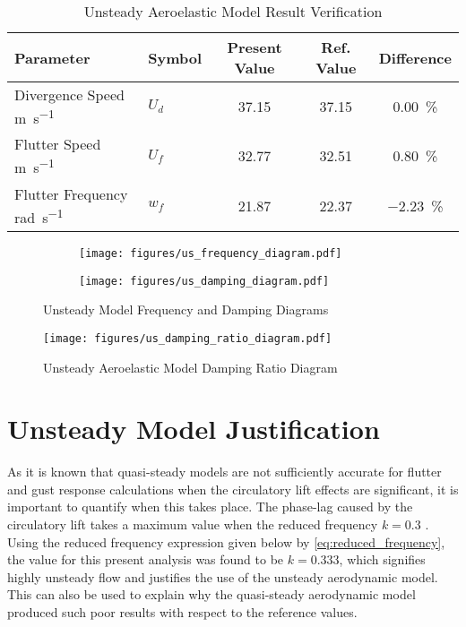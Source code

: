 \begin{table}[H]
    \centering
    \caption{Unsteady Aeroelastic Model Result Verification}
    \label{tab:us_verification}
    \begin{tabularx}{\textwidth}{p{}P{0.1\textwidth}CCC}
    \toprule
    \textbf{Parameter} & \textbf{Symbol} &\textbf{Present Value}
    &\textbf{Ref. Value \autocite{howcroftEfficientAeroelasticBeam2019}}
    & \textbf{Difference} \\
    \midrule
    Divergence Speed \si{\meter\per\second}
    & $U_d$ & 37.15 & 37.15 & \SI{0.00}{\percent}\\
    Flutter Speed \si{\meter\per\second}
    & $U_f$ & 32.77 & 32.51 & \SI{0.80}{\percent}\\
    Flutter Frequency \si{\radian\per\second}
    & $w_f$ & 21.87 & 22.37 & \SI{-2.23}{\percent} \\ \bottomrule
    \end{tabularx}
\end{table}

\begin{figure}[H]
    \centering
    \begin{subfigure}[b]{0.5\textwidth}
      \centering
      \texttt{[image: figures/us\_frequency\_diagram.pdf]}
      \label{fig:us_frequency}
    \end{subfigure}%
    \begin{subfigure}[b]{0.5\textwidth}
      \centering
      \texttt{[image: figures/us\_damping\_diagram.pdf]}
      \label{fig:us_damping}
    \end{subfigure}
    \caption{Unsteady Model Frequency and Damping Diagrams} %
    \label{fig:us_flutter_diagram}
\end{figure}

\begin{figure}[H]
    \centering
    \texttt{[image: figures/us\_damping\_ratio\_diagram.pdf]}
    \caption{Unsteady Aeroelastic Model Damping Ratio Diagram}
    \label{fig:us_damping_ratio}
\end{figure}

\section{Unsteady Model Justification}
As it is known that quasi-steady models are not sufficiently accurate for
flutter and gust response calculations when the circulatory lift effects are
significant, it is important to quantify when this takes place. The phase-lag
caused by the circulatory lift takes a maximum value when the reduced frequency
$k=0.3$ \autocite[p.157]{wrightIntroductionAircraftAeroelasticity}. Using the
reduced frequency expression given below by \cref{eq:reduced_frequency}, the
value for this present analysis was found to be $k=0.333$, which signifies
highly unsteady flow and justifies the use of the unsteady aerodynamic model.
This can also be used to explain why the quasi-steady aerodynamic model
produced such poor results with respect to the reference values.

